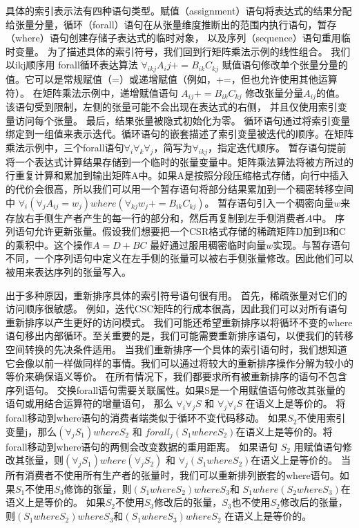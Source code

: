 \begin{translation}
具体的索引表示法有四种语句类型。赋值（assignment）语句将表达式的结果分配给张量分量，循环（forall）语句在从张量维度推断出的范围内执行语句，暂存（where）语句创建存储子表达式的临时对象，
以及序列（sequence）语句重用临时变量。
为了描述具体的索引符号，我们回到行矩阵乘法示例的线性组合。 我们以ikj顺序用 forall循环表达算法 $\forall_{ikj} A_ij +=B_{ik}C_{kj}$
赋值语句修改单个张量分量的值。它可以是常规赋值（=）或递增赋值（例如，+=，但也允许使用其他运算符）。
在矩阵乘法示例中，递增赋值语句 $ A_{ij} += B_{ik}C_{kj} $ 修改张量分量$ A_{ij} $的值。该语句受到限制，左侧的张量可能不会出现在表达式的右侧，
并且仅使用索引变量访问每个张量。 最后，结果张量被隐式初始化为零。
循环语句通过将索引变量绑定到一组值来表示迭代。循环语句的嵌套描述了索引变量被迭代的顺序。在矩阵乘法示例中，三个forall语句$ \forall_i\forall_k\forall_j $，简写为$\forall_{ikj}$，指定迭代顺序。
暂存语句提前将一个表达式计算结果存储到一个临时的张量变量中。矩阵乘法算法将被方所过的行重复计算和累加到输出矩阵A中。如果A是按照分段压缩格式存储，向行中插入的代价会很高，所以我们可以用一个暂存语句将部分结果累加到一个稠密转移空间中 $\forall_i(\forall_j A_{ij}=w_j) where (\forall_{kj}w_j+=B_{ik}C_{kj})$。
暂存语句引入一个稠密向量$w$来存放右手侧生产者产生的每一行的部分和，然后再复制到左手侧消费者$A$中。
序列语句允许更新张量。假设我们想要把一个CSR格式存储的稀疏矩阵D加到B和C的乘积中。这个操作$ A = D+ BC$ 最好通过服用稠密临时向量$w$实现。与暂存语句不同，一个序列语句中定义在左手侧的张量可以被右手侧张量修改。因此他们可以被用来表达序列的张量写入。


出于多种原因，重新排序具体的索引符号语句很有用。 首先，稀疏张量对它们的访问顺序很敏感。 例如，迭代CSC矩阵的行成本很高，因此我们可以对所有语句重新排序以产生更好的访问模式。
我们可能还希望重新排序以将循环不变的where语句移出内部循环。至关重要的是，我们可能需要重新排序语句，以便我们的转移空间转换的先决条件适用。
当我们重新排序一个具体的索引语句时，我们想知道它会像以前一样做同样的事情。我们可以通过将较大的重新排序操作分解为较小的等价来确保语义等价。
在所有情况下，我们都要求所有被重新排序的语句不包含序列语句。 交换forall语句需要关联属性。如果S是一个用赋值语句修改其张量的语句或用结合运算符的增量语句，
那么 $\forall_i \forall_j S$ 和 $\forall_j \forall_i S$ 在语义上是等价的。 将forall移动到where语句的消费者端类似于循环不变代码移动。
如果$S_2$不使用索引变量j，那么$(\forall_j S_1)where S_2$ 和 $forall_j(S_1 where S_2)$在语义上是等价的。将forall移动到where语句的两侧会改变数据的重用距离。
如果语句 $S_2$ 用赋值语句修改其张量，则$(\forall_j S_1)where (\forall_j S_2)$ 和 $\forall_j(S_1 where S_2)$在语义上是等价的。 
当所有消费者不使用所有生产者的张量时，我们可以重新排列嵌套的where语句。如果$S_1$不使用$S_3$修饰的张量，则$(S_1 where S_2) where S_3$和
$S_1 where (S_2 where S_3)$在语义上是等价的。 如果$S_2$不使用$S_3$修改后的张量，$S_3$也不使用$S_2$修改后的张量，则$(S_1 where S_2) where S_3$和$(S_1 where S_3) where S_2$
在语义上是等价的。


\end{translation}
